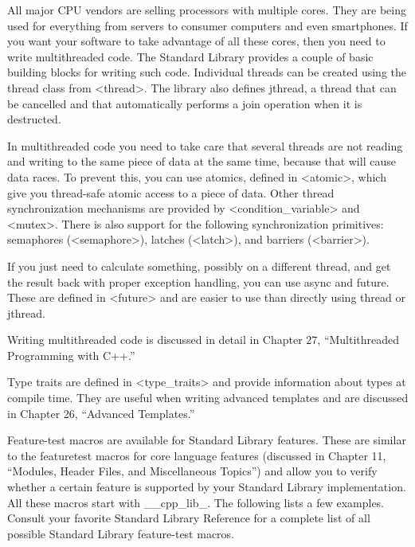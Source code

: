 
All major CPU vendors are selling processors with multiple cores. They are being used for everything from servers to consumer computers and even smartphones. If you want your software to take advantage of all these cores, then you need to write multithreaded code. The Standard Library provides a couple of basic building blocks for writing such code. Individual threads can be created using the thread class from <thread>. The library also defines jthread, a thread that can be cancelled and that automatically performs a join operation when it is destructed.

In multithreaded code you need to take care that several threads are not reading and writing to the same piece of data at the same time, because that will cause data races. To prevent this, you can use atomics, defined in <atomic>, which give you thread-safe atomic access to a piece of data. Other thread synchronization mechanisms are provided by <condition\_variable> and <mutex>. There is also support for the following synchronization primitives: semaphores (<semaphore>), latches (<latch>), and barriers (<barrier>).

If you just need to calculate something, possibly on a different thread, and get the result back with proper exception handling, you can use async and future. These are defined in <future> and are easier to use than directly using thread or jthread.

Writing multithreaded code is discussed in detail in Chapter 27, “Multithreaded Programming with C++.”


Type traits are defined in <type\_traits> and provide information about types at compile time. They are useful when writing advanced templates and are discussed in Chapter 26, “Advanced Templates.”


Feature-test macros are available for Standard Library features. These are similar to the featuretest macros for core language features (discussed in Chapter 11, “Modules, Header Files, and Miscellaneous Topics”) and allow you to verify whether a certain feature is supported by your Standard Library implementation. All these macros start with \_\_cpp\_lib\_. The following lists a few examples. Consult your favorite Standard Library Reference for a complete list of all possible Standard Library feature-test macros.

